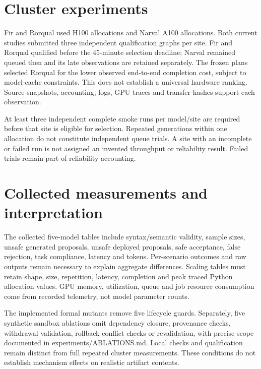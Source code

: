 \documentclass[11pt]{article}
\begin{document}

\section{Cluster experiments}
Fir and Rorqual used H100 allocations and Narval A100 allocations. Both current studies submitted three independent qualification graphs per site. Fir and Rorqual qualified before the 45-minute selection deadline; Narval remained queued then and its late observations are retained separately. The frozen plans selected Rorqual for the lower observed end-to-end completion cost, subject to model-cache constraints. This does not establish a universal hardware ranking. Source snapshots, accounting, logs, GPU traces and transfer hashes support each observation.

At least three independent complete smoke runs per model/site are required before that site is eligible for selection. Repeated generations within one allocation do not constitute independent queue trials. A site with an incomplete or failed run is not assigned an invented throughput or reliability result. Failed trials remain part of reliability accounting.

\section{Collected measurements and interpretation}
The collected five-model tables include syntax/semantic validity, sample sizes, unsafe generated proposals, unsafe deployed proposals, safe acceptance, false rejection, task compliance, latency and tokens. Per-scenario outcomes and raw outputs remain necessary to explain aggregate differences. Scaling tables must retain shape, size, repetition, latency, completion and peak traced Python allocation values. GPU memory, utilization, queue and job resource consumption come from recorded telemetry, not model parameter counts.

The implemented formal mutants remove five lifecycle guards. Separately, five synthetic sandbox ablations omit dependency closure, provenance checks, withdrawal validation, rollback conflict checks or revalidation, with precise scope documented in experiments/ABLATIONS.md. Local checks and qualification remain distinct from full repeated cluster measurements. These conditions do not establish mechanism effects on realistic artifact contents.
\end{document}
